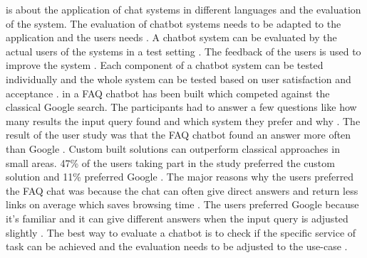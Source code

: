 \documentclass[12pt, backref]{report}
\begin{document}
\citet{evaluateChatbotsShawar2007} is about the application of chat systems in different languages and the evaluation of the system.
The evaluation of chatbot systems needs to be adapted to the application and the users needs \cite{evaluateChatbotsShawar2007}.
A chatbot system can be evaluated by the actual users of the systems in a test setting \cite{evaluateChatbotsShawar2007}.
The feedback of the users is used to improve the system \cite{evaluateChatbotsShawar2007}. 
Each component of a chatbot system can be tested individually and the whole system can be tested based on user satisfaction and acceptance \cite{evaluateChatbotsShawar2007}.
in \citet{evaluateChatbotsShawar2007} a FAQ chatbot has been built which competed against the classical Google search.
The participants had to answer a few questions like how many results the input query found and which system they prefer and why \cite{evaluateChatbotsShawar2007}. 
The result of the user study was that the FAQ chatbot found an answer more often than Google \cite{evaluateChatbotsShawar2007}.
Custom built solutions can outperform classical approaches in small areas.
47\% of the users taking part in the study preferred the custom solution and 11\% preferred Google \cite{evaluateChatbotsShawar2007}.
The major reasons why the users preferred the FAQ chat was because the chat can often give direct answers and return less links on average which saves browsing time \cite{evaluateChatbotsShawar2007}. 
The users preferred Google because it's familiar and it can give different answers when the input query is adjusted slightly \cite{evaluateChatbotsShawar2007}.
The best way to evaluate a chatbot is to check if the specific service of task can be achieved and the evaluation needs to be adjusted to the use-case \cite{evaluateChatbotsShawar2007}.
\end{document}
